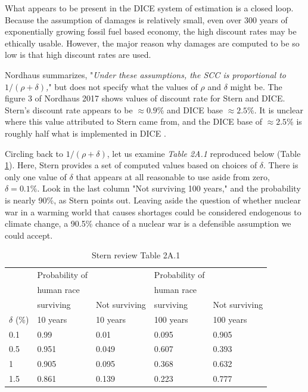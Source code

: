 \documentclass{article}
\begin{document}
What appears to be present in the DICE system of estimation is a closed loop. Because the assumption of damages is relatively small, even over 300 years of exponentially growing fossil fuel based economy, the high discount rates may be ethically usable. However, the major reason why damages are computed to be so low is that high discount rates are used.  

Nordhaus summarizes, "\emph{Under these assumptions, the SCC is proportional to $1/(\rho + \delta)$,}" but does not specify what the values of $\rho$ and $\delta$ might be. The figure 3 of Nordhaus 2017 \cite{Nordhaus2017RevisitingTheSCC} shows values of discount rate for Stern and DICE. Stern's discount rate appears to be $\approx 0.9$\% and DICE base $\approx 2.5$\%. It is unclear where this value attributed to Stern came from, and the DICE base of $\approx 2.5$\% is roughly half what is implemented in DICE \cite{nordhaussztorc2016Rdice,Nordhaus2018ChangesinDICE_Model}.

Circling back to $1/(\rho + \delta)$, let us examine \emph{Table 2A.1} \cite[p. 47]{Stern2007EconomicsofClimateChangeSternReview} reproduced below (Table \ref{Table_2A1_fromSternReview}). Here, Stern provides a set of computed values based on choices of $\delta$. There is only one value of $\delta$ that appears at all reasonable to use aside from zero, $\delta = 0.1\%$. Look in the last column "Not surviving 100 years," and the probability is nearly 90\%, as Stern points out. Leaving aside the question of whether nuclear war in a warming world that causes shortages could be considered endogenous to climate change, a 90.5\% chance of a nuclear war is a defensible assumption we could accept. 

\begin{table}[!hbt] 
\caption{Stern review Table 2A.1} 
\label{Table_2A1_fromSternReview}
\begin{tabular}{l|llll}
       & Probability of &               & Probability of &               \\
       & human race     &               & human race     &               \\
       & surviving      & Not surviving & surviving      & Not surviving \\
$\delta$ (\%) & 10 years       & 10 years      & 100 years      & 100 years     \\ \hline
0.1    & 0.99           & 0.01          & 0.095          & 0.905         \\
0.5    & 0.951          & 0.049         & 0.607          & 0.393         \\
1      & 0.905          & 0.095         & 0.368          & 0.632         \\
1.5    & 0.861          & 0.139         & 0.223          & 0.777        
\end{tabular}
\end{table}
\end{document}
